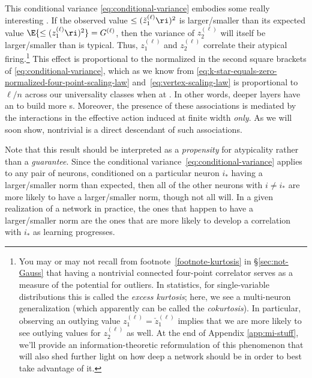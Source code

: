 This conditional variance \eqref{eq:conditional-variance} embodies some really interesting . 
If the observed value $\le(\check{z}_1^{(\ell)}\ri)^2$ is larger/smaller than its expected value $\E{\le(z_1^{(\ell)}\ri)^2}=G^{(\ell)}$, then
the variance of $z_2^{(\ell)}$ will itself be larger/smaller than is typical. Thus, $z_1^{(\ell)}$ and $z_2^{(\ell)}$ correlate their atypical firing.\footnote{You may or may not recall from footnote~\ref{footnote-kurtosis} in \S\ref{sec:not-Gauss} that having a nontrivial connected four-point correlator serves as a measure of the potential for outliers. In statistics, for single-variable distributions this is called the \emph{excess kurtosis}; here, we see a multi-neuron generalization (which apparently can be called the \emph{cokurtosis}). In particular, observing an outlying value $z_1^{(\ell)} = \check{z}_1^{(\ell)}$ implies that we are more likely to see outlying values for $z_2^{(\ell)}$ as well.
At the end of Appendix \ref{app:mi-stuff}, we'll provide an information-theoretic reformulation of this phenomenon that will also shed further light on how deep a network should be in order to best take advantage of it.
} This effect is proportional to the normalized  in the second square brackets of \eqref{eq:conditional-variance}, which  as we know from \eqref{eq:k-star-equals-zero-normalized-four-point-scaling-law} and~\eqref{eq:vertex-scaling-law} is proportional to $\ell/n$ across our universality classes when at .
In other words, deeper layers have an  to build more s. Moreover, the presence of these associations is mediated by the interactions in the effective action induced at finite width \emph{only}. As we will soon show, nontrivial  is a direct descendant of such associations.


Note that this result should be interpreted as a \emph{propensity} for atypicality rather than a \emph{guarantee}. Since the conditional variance~\eqref{eq:conditional-variance} applies to any pair of neurons, conditioned on a particular neuron $i_*$ having a larger/smaller norm than expected, then all of the other neurons with $i \neq i_*$ are more likely to have a larger/smaller norm, though not all will. In a given realization of a network in practice, the ones that happen to have a larger/smaller norm are the ones that are more likely to develop a correlation with $i_*$ as learning progresses.

